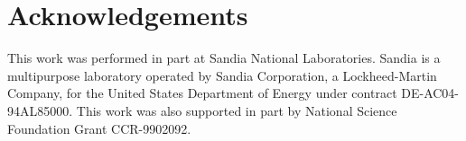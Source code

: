 
\section*{Acknowledgements}

This work was performed in part at Sandia National Laboratories. Sandia is a multipurpose laboratory operated by Sandia Corporation, a Lockheed-Martin Company, for the United States Department of Energy under contract DE-AC04-94AL85000.
This work was also supported in part by National Science Foundation
Grant CCR-9902092.
